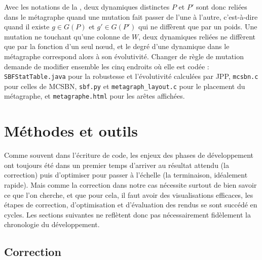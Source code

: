 \documentclass[12pt, a4paper]{article}
\begin{document}
Avec les notations de la , deux dynamiques distinctes $P$ et $P'$ sont donc reliées dans le métagraphe quand une mutation fait passer de l'une à l'autre, c'est-à-dire quand il existe $g \in G(P)$ et $g' \in G(P')$ qui ne diffèrent que par un poids.
Une mutation ne touchant qu'une colonne de $W$, deux dynamiques reliées ne diffèrent que par la fonction d'un seul nœud, et le degré d'une dynamique dans le métagraphe correspond alors à son évolutivité.
Changer de règle de mutation demande de modifier ensemble les cinq endroits où elle est codée : \texttt{SBFStatTable.java} pour la robustesse et l'évolutivité calculées par JPP, \texttt{mcsbn.c} pour celles de MCSBN, \texttt{sbf.py} et \texttt{metagraph\_layout.c} pour le placement du métagraphe, et \texttt{metagraphe.html} pour les arêtes affichées.

\section{Méthodes et outils}

Comme souvent dans l'écriture de code, les enjeux des phases de développement ont toujours été dans un premier temps d'arriver au résultat attendu (la correction) puis d'optimiser pour passer à l'échelle (la terminaison, idéalement rapide). Mais comme la correction dans notre cas nécessite surtout de bien savoir ce que l'on cherche, et que pour cela, il faut avoir des visualisations efficaces, les étapes de correction, d'optimisation et d'évaluation des rendus se sont succédé en cycles. Les sections suivantes ne reflètent donc pas nécessairement fidèlement la chronologie du développement.


\subsection{Correction}
\label{sec:correction}
\end{document}
